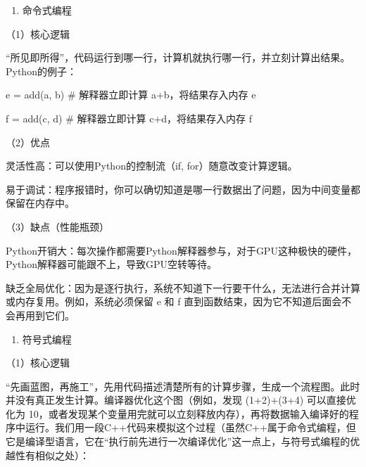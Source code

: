 \begin{enumerate}
\def\labelenumi{\arabic{enumi}.}
\tightlist
\item
  命令式编程
\end{enumerate}

（1）核心逻辑

``所见即所得''，代码运行到哪一行，计算机就执行哪一行，并立刻计算出结果。Python的例子：

e = add(a, b) \# 解释器立即计算 a+b，将结果存入内存 e

f = add(c, d) \# 解释器立即计算 c+d，将结果存入内存 f

（2）优点

灵活性高：可以使用Python的控制流（if, for）随意改变计算逻辑。

易于调试：程序报错时，你可以确切知道是哪一行数据出了问题，因为中间变量都保留在内存中。

（3）缺点（性能瓶颈）

Python开销大：每次操作都需要Python解释器参与，对于GPU这种极快的硬件，Python解释器可能跟不上，导致GPU空转等待。

缺乏全局优化：因为是逐行执行，系统不知道下一行要干什么，无法进行合并计算或内存复用。例如，系统必须保留 e 和 f 直到函数结束，因为它不知道后面会不会再用到它们。

\begin{enumerate}
\def\labelenumi{\arabic{enumi}.}
\setcounter{enumi}{1}
\tightlist
\item
  符号式编程
\end{enumerate}

（1）核心逻辑

``先画蓝图，再施工''，先用代码描述清楚所有的计算步骤，生成一个流程图。此时并没有真正发生计算。编译器优化这个图（例如，发现 (1+2)+(3+4) 可以直接优化为 10，或者发现某个变量用完就可以立刻释放内存），再将数据输入编译好的程序中运行。我们用一段C++代码来模拟这个过程（虽然C++属于命令式编程，但它是编译型语言，它在``执行前先进行一次编译优化''这一点上，与符号式编程的优越性有相似之处）：

